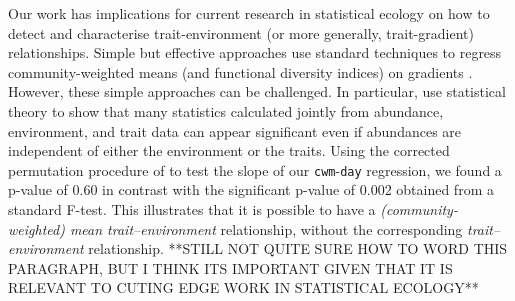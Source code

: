 \documentclass[12pt]{ecology}
\begin{document}
Our work has implications for current research in statistical ecology on how to detect and characterise trait-environment (or more generally, trait-gradient) relationships.  Simple but effective approaches use standard techniques to regress community-weighted means (and functional diversity indices) on gradients \citetext{e.g. \citealp{DiazEtAl2007, SpasojevicAndSuding2011}}.  However, these simple approaches can be challenged.  In particular, \citet{terBraakEtAl2012} use statistical theory to show that many statistics calculated jointly from abundance, environment, and trait data \citetext{i.e. three-table data; \citealp{DoledecEtAl1996, LegendreEtAl1997}} can appear significant even if abundances are independent of either the environment or the traits.  Using the corrected permutation procedure of \citet{terBraakEtAl2012} to test the slope of our \texttt{cwm}-\texttt{day} regression, we found a p-value of 0.60 in contrast with the significant p-value of 0.002 obtained from a standard F-test.  This illustrates that it is possible to have a \emph{(community-weighted) mean trait--environment} relationship, without the corresponding \emph{trait--environment} relationship.   **STILL NOT QUITE SURE HOW TO WORD THIS PARAGRAPH, BUT I THINK ITS IMPORTANT GIVEN THAT IT IS RELEVANT TO CUTING EDGE WORK IN STATISTICAL ECOLOGY**


\end{document}
